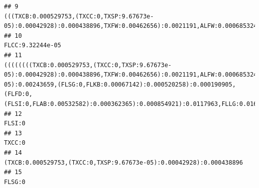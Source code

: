 \documentclass[]{article}
\begin{document}
\begin{verbatim}
## 9                                                                                                                                                                                                                                                                                   (((TXCB:0.000529753,(TXCC:0,TXSP:9.67673e-05):0.00042928):0.000438896,TXFW:0.00462656):0.0021191,ALFW:0.000685324):0.000140543
## 10                                                                                                                                                                                                                                                                                                                                                                                                FLCC:9.32244e-05
## 11                                                               ((((((((TXCB:0.000529753,(TXCC:0,TXSP:9.67673e-05):0.00042928):0.000438896,TXFW:0.00462656):0.0021191,ALFW:0.000685324):0.000140543,LAFW:0.000833551):0.000556541,ALST:7.75698e-05):0.00243659,(FLSG:0,FLKB:0.00067142):0.000520258):0.000190905,(FLFD:0,(FLSI:0,FLAB:0.00532582):0.000362365):0.000854921):0.0117963,FLLG:0.0165317):0.000460481
## 12                                                                                                                                                                                                                                                                                                                                                                                                          FLSI:0
## 13                                                                                                                                                                                                                                                                                                                                                                                                          TXCC:0
## 14                                                                                                                                                                                                                                                                                                                                             (TXCB:0.000529753,(TXCC:0,TXSP:9.67673e-05):0.00042928):0.000438896
## 15                                                                                                                                                                                                                                                                                                                                                                                                          FLSG:0

\end{verbatim}
\end{document}
